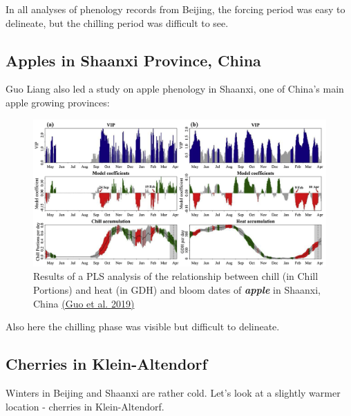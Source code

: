 \documentclass[
]{book}
\begin{document}
In all analyses of phenology records from Beijing, the forcing period was easy to delineate, but the chilling period was difficult to see.

\hypertarget{apples-in-shaanxi-province-china}{%
\subsection{Apples in Shaanxi Province, China}\label{apples-in-shaanxi-province-china}}

Guo Liang also led a study on apple phenology in Shaanxi, one of China's main apple growing provinces:

\begin{figure}
\centering
\includegraphics{pictures/PLS_chill_force_apple_China.png}
\caption{Results of a PLS analysis of the relationship between chill (in Chill Portions) and heat (in GDH) and bloom dates of \textbf{\emph{apple}} in Shaanxi, China \href{https://www.sciencedirect.com/science/article/abs/pii/S0168192319300462?casa_token=FxJzdv0_vDsAAAAA:ZPkcZPW3L6Y2pPEnVHGnwj--22CdA-N0jhUUhH_FfHgNok50k8BVw6TtQ7MzZ79_tlMaI_aoGiAD}{(Guo et al. \protect\hyperlink{ref-guo2019distribution}{2019})}}
\end{figure}

Also here the chilling phase was visible but difficult to delineate.

\hypertarget{cherries-in-klein-altendorf}{%
\subsection{Cherries in Klein-Altendorf}\label{cherries-in-klein-altendorf}}

Winters in Beijing and Shaanxi are rather cold. Let's look at a slightly warmer location - cherries in Klein-Altendorf.
\end{document}
